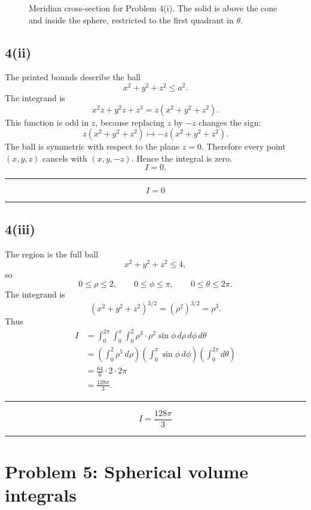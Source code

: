 \documentclass[11pt,a4paper]{article}
\newenvironment{resultbox}{\par\medskip\noindent\begin{minipage}{\linewidth}\hrule\smallskip}{\smallskip\hrule\end{minipage}\par\medskip}
\newcommand{\ans}[1]{\begin{resultbox}\[\boxed{#1}\]\end{resultbox}}
\begin{document}
\begin{figure}[H]
\centering
{}
\caption{Meridian cross-section for Problem 4(i). The solid is above the cone and inside the sphere, restricted to the first quadrant in \(\theta\).}
\end{figure}

\subsection*{4(ii)}
The printed bounds describe the ball
\[
x^2+y^2+z^2\le a^2.
\]
The integrand is
\[
x^2z+y^2z+z^3=z(x^2+y^2+z^2).
\]
This function is odd in \(z\), because replacing \(z\) by \(-z\) changes the sign:
\[
z(x^2+y^2+z^2)\mapsto -z(x^2+y^2+z^2).
\]
The ball is symmetric with respect to the plane \(z=0\). Therefore every point \((x,y,z)\) cancels with \((x,y,-z)\). Hence the integral is zero.
\[
I=0.
\]
\ans{I=0}

\subsection*{4(iii)}
The region is the full ball
\[
x^2+y^2+z^2\le4,
\]
so
\[
0\le\rho\le2,
\qquad 0\le\phi\le\pi,
\qquad 0\le\theta\le2\pi.
\]
The integrand is
\[
(x^2+y^2+z^2)^{3/2}=(\rho^2)^{3/2}=\rho^3.
\]
Thus
\begin{align*}
I&=\int_0^{2\pi}\int_0^\pi\int_0^2 \rho^3\cdot \rho^2\sin\phi\,d\rho\,d\phi\,d\theta\\
&=\left(\int_0^2\rho^5\,d\rho\right)
\left(\int_0^\pi\sin\phi\,d\phi\right)
\left(\int_0^{2\pi}d\theta\right)\\
&=\frac{64}{6}\cdot 2\cdot2\pi\\
&=\frac{128\pi}{3}.
\end{align*}
\ans{I=\frac{128\pi}{3}}

\section{Problem 5: Spherical volume integrals}
\end{document}
